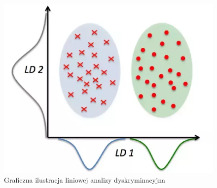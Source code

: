 \begin{figure}[ht!]
\centering
\includegraphics[scale=0.5]{res/lda.png}
\caption[Caption for LOF]{Graficzna ilustracja liniowej analizy dyskryminacyjna\footnotemark} \label{lda} 
\end{figure}
